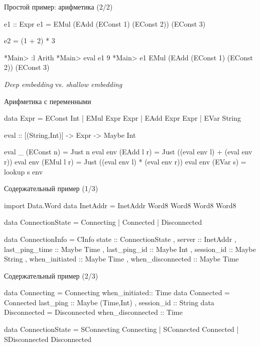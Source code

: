 \documentclass[
  xcolor={svgnames},
  hyperref={colorlinks,citecolor=DeepPink4,linkcolor=DarkRed,urlcolor=DarkBlue}]{beamer}
\begin{document}
\begin{frame}[fragile]{Простой пример: арифметика (2/2)}
\begin{verbnobox}[\monacoB]
e1 :: Expr
e1 = EMul (EAdd (EConst 1) (EConst 2)) (EConst 3)

e2 = (1 + 2) * 3
\end{verbnobox}
\pause
\begin{verbnobox}[\monacoB]
*Main> :l Arith
*Main> eval e1
9
*Main> e1
EMul (EAdd (EConst 1) (EConst 2)) (EConst 3)
\end{verbnobox}
\vspace{1cm}
\textit{Deep embedding} vs. \textit{shallow embedding}
\end{frame}

\begin{frame}[fragile]{Арифметика с переменными}
\begin{verbnobox}[\monacoB]
data Expr = 
    EConst Int
  | EMul Expr Expr
  | EAdd Expr Expr
  | EVar String
 
eval :: [(String,Int)] -> Expr -> Maybe Int
\end{verbnobox}
\pause
\begin{verbnobox}[\monacoB]
eval _ (EConst n) = Just n
eval env (EAdd l r) = 
  Just ((eval env l) + (eval env r))
eval env (EMul l r) = 
  Just ((eval env l) * (eval env r))
eval env (EVar s) = lookup s env 
\end{verbnobox}
\end{frame}

\begin{frame}[fragile]{Содержательный пример (1/3)}
\begin{verbnobox}[\monacoB]
import Data.Word
data InetAddr = InetAddr Word8 Word8 Word8 Word8

data ConnectionState = 
  Connecting  | Connected  | Disconnected 
  
data ConnectionInfo = CInfo 
  { state ::                   ConnectionState
  , server ::                  InetAddr
  , last_ping_time ::          Maybe Time
  , last_ping_id ::            Maybe Int
  , session_id ::              Maybe String
  , when_initiated ::          Maybe Time
  , when_disconnected ::       Maybe Time
  } 
\end{verbnobox}
\end{frame}

\begin{frame}[fragile]{Содержательный пример (2/3)}
\begin{verbnobox}[\monacoB]
data Connecting = 
  Connecting { when_initiated:: Time } 
data Connected  = Connected 
  { last_ping  :: Maybe (Time,Int)
  , session_id :: String } 
data Disconnected = 
  Disconnected { when_disconnected :: Time } 
 
data ConnectionState = 
    SConnecting   Connecting 
  | SConnected    Connected 
  | SDisconnected Disconnected 
\end{verbnobox}
\end{frame}
\end{document}
